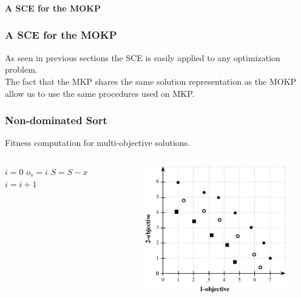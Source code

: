 %
\begin{frame}
\frametitle{}
\begin{center}
  \textbf{\Large A SCE for the MOKP}
\end{center}
\end{frame}

%
\begin{frame}
\frametitle{A SCE for the MOKP}
As seen in previous sections
the SCE is easily applied to any optimization problem.
\\ \bigskip \pause
The fact that the MKP shares the same solution representation
as the MOKP allow us to use the same procedures
used on MKP.
\end{frame}

%
\begin{frame}
\frametitle{Non-dominated Sort}
Fitness computation for multi-objective solutions.
\medskip
\begin{columns}
\begin{column}{0.5\textwidth}  %
  \begin{algorithmic}[1]
      \State $i = 0$
            \State $o_s = i$
            \State $S = S - {x}$
          \EndIf
        \EndFor
        \State $i = i+1$
      \EndWhile
    \EndFunction
  \end{algorithmic}
\end{column}
\begin{column}{0.5\textwidth}
  \begin{figure}
    \centering
    \includegraphics{img/pareto-sort}
  \end{figure}
\end{column}
\end{columns}
\end{frame}


